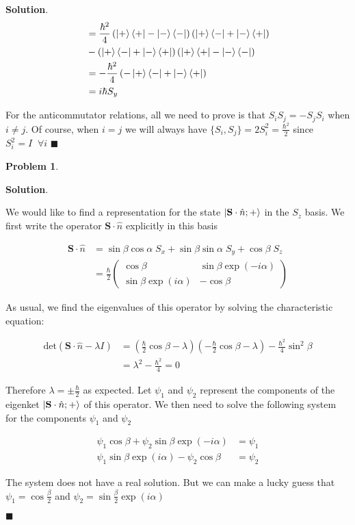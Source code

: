 \documentclass[12pt]{article}
\newtheorem{p}{Problem}
\theoremstyle{definition}
\newenvironment{s}{%
        \begin{trivlist} \item \textbf{Solution}. }{%
            \hspace*{\fill} $\blacksquare$\end{trivlist}}%
\begin{document}
{\begin{s}
\begin{align*}
[S_{z},S_{x}] &= \frac{\hbar^{2}}{4}\left(\ket{+}\bra{+} - \ket{-}\bra{-}\right)\left(\ket{+}\bra{-} + \ket{-}\bra{+}\right)\\
&- \left(\ket{+}\bra{-} + \ket{-}\bra{+}\right)\left(\ket{+}\bra{+} - \ket{-}\bra{-}\right)\\
&= -\frac{\hbar^{2}}{4}\left(-\ket{+}\bra{-} + \ket{-}\bra{+}\right)\\
&= i\hbar S_{y}
\end{align*}

For the anticommutator relations, all we need to prove is that $S_{i}S_{j} = -S_{j}S_{i}$ when $i\neq j$. Of course, when $i=j$ we will always have $\{S_{i},S_{j}\} = 2S_{i}^{2} = \frac{\hbar^{2}}{2}$ since $S_{i}^{2} = I \;\;\forall i$
\end{s}

\begin{p}

\end{p}

\begin{s} 

We would like to find a representation for the state $\ket{\mathbf{S}\cdot\hat{n}; +}$ in the $S_{z}$ basis. We first write the operator $\mathbf{S}\cdot\hat{n}$ explicitly in this basis

\begin{align*}
\mathbf{S}\cdot\hat{n} &= \sin\beta\cos\alpha \; S_{x} +\sin\beta\sin\alpha\;S_{y} + \cos\beta\; S_{z}\\
&= \frac{\hbar}{2}\begin{pmatrix}
\cos\beta & \sin\beta\exp(-i\alpha)\\
\sin\beta\exp(i\alpha) & -\cos\beta
\end{pmatrix}
\end{align*}

As usual, we find the eigenvalues of this operator by solving the characteristic equation:

\begin{align*}
\mathrm{det}\left(\mathbf{S}\cdot\hat{n} - \lambda I\right) &= \left(\frac{\hbar}{2}\cos\beta - \lambda\right)\left(-\frac{\hbar}{2}\cos\beta - \lambda\right) - \frac{\hbar^{2}}{4}\sin^{2}\beta\\
&= \lambda^{2} - \frac{\hbar^{2}}{4} = 0
\end{align*}

Therefore $\lambda = \pm \frac{\hbar}{2}$ as expected. Let $\psi_{1}$ and $\psi_{2}$ represent the components of the eigenket $\ket{\mathbf{S}\cdot\hat{n}; +}$ of this operator. We then need to solve the following system for the components $\psi_{1}$ and $\psi_{2}$

\begin{align*}
\psi_{1}\cos\beta+\psi_{2}\sin\beta\exp(-i\alpha) &= \psi_{1}\\
\psi_{1}\sin\beta\exp(i\alpha) - \psi_{2}\cos\beta &= \psi_{2}
\end{align*}

The system does not have a real solution. But we can make a lucky guess that $\psi_{1} = \cos\frac{\beta}{2}$ and $\psi_{2} = \sin\frac{\beta}{2}\exp(i\alpha)$


\end{s}
\end{document}
